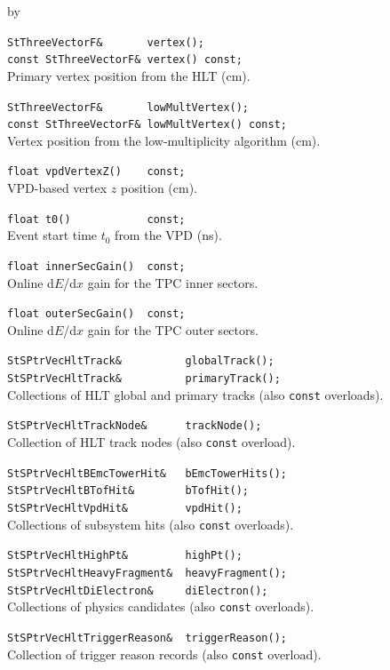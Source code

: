 \documentclass[twoside]{article}
\newcommand{\entrylabel}[1]{\mbox{\textbf{{#1}}}\hfil}%
\newenvironment{entry}
{\begin{list}{}%
    {\renewcommand{\makelabel}{\entrylabel}%
     \setlength{\labelwidth}{90pt}%
     \setlength{\leftmargin}{\labelwidth}
     \advance\leftmargin by \labelsep%
      }%
    }%
  {\end{list}}
\newcommand{\Entrylabel}[1]%
{\raisebox{0pt}[1ex][0pt]{\makebox[\labelwidth][l]%
    {\parbox[t]{\labelwidth}{\hspace{0pt}\textbf{{#1}}}}}}
\newenvironment{Entry}%
{\renewcommand{\entrylabel}{\Entrylabel}\begin{entry}}%
  {\end{entry}}
\begin{document}
\begin{Entry}
    \verb+StThreeVectorF&       vertex();+\\
    \verb+const StThreeVectorF& vertex() const;+\\
    Primary vertex position from the HLT (cm).

    \verb+StThreeVectorF&       lowMultVertex();+\\
    \verb+const StThreeVectorF& lowMultVertex() const;+\\
    Vertex position from the low-multiplicity algorithm (cm).

    \verb+float vpdVertexZ()    const;+\\
    VPD-based vertex $z$ position (cm).

    \verb+float t0()            const;+\\
    Event start time $t_0$ from the VPD (ns).

    \verb+float innerSecGain()  const;+\\
    Online d$E$/d$x$ gain for the TPC inner sectors.

    \verb+float outerSecGain()  const;+\\
    Online d$E$/d$x$ gain for the TPC outer sectors.

    \verb+StSPtrVecHltTrack&          globalTrack();+\\
    \verb+StSPtrVecHltTrack&          primaryTrack();+\\
    Collections of HLT global and primary tracks (also \texttt{const}
    overloads).

    \verb+StSPtrVecHltTrackNode&      trackNode();+\\
    Collection of HLT track nodes (also \texttt{const} overload).

    \verb+StSPtrVecHltBEmcTowerHit&   bEmcTowerHits();+\\
    \verb+StSPtrVecHltBTofHit&        bTofHit();+\\
    \verb+StSPtrVecHltVpdHit&         vpdHit();+\\
    Collections of subsystem hits (also \texttt{const} overloads).

    \verb+StSPtrVecHltHighPt&         highPt();+\\
    \verb+StSPtrVecHltHeavyFragment&  heavyFragment();+\\
    \verb+StSPtrVecHltDiElectron&     diElectron();+\\
    Collections of physics candidates (also \texttt{const} overloads).

    \verb+StSPtrVecHltTriggerReason&  triggerReason();+\\
    Collection of trigger reason records (also \texttt{const} overload).


\end{Entry}
\end{document}
